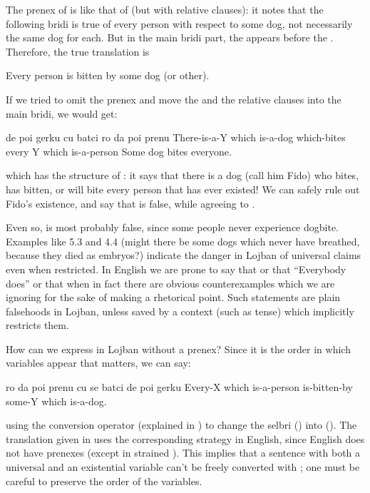 The prenex of  is like that
    of  (but with relative clauses):
    it notes that the following bridi is true of every person with
    respect to some dog, not necessarily the same dog for each. But
    in the main bridi part, the  appears before the .
    Therefore, the true translation is
\begin{example}
Every person is bitten by some dog (or other).
\end{example}

If we tried to omit the prenex and move the  and the
    relative clauses into the main bridi, we would get:
\begin{example}
de poi gerku cu batci\n
\T	ro da poi prenu\n
There-is-a-Y which is-a-dog which-bites\n
\T	every Y which is-a-person\n
Some dog bites everyone.
\end{example}

{\noindent}which has the structure of : it
    says that there is a dog (call him Fido) who bites, has bitten,
    or will bite every person that has ever existed! We can safely
    rule out Fido's existence, and say that  is false, while agreeing to . 

Even so,  is most probably
    false, since some people never experience dogbite. Examples
    like 5.3 and 4.4 (might there be some dogs which never have
    breathed, because they died as embryos?) indicate the danger in
    Lojban of universal claims even when restricted. In English we
    are prone to say that  or that ``Everybody
    does'' or that  when in fact there are obvious
    counterexamples which we are ignoring for the sake of making a
    rhetorical point. Such statements are plain falsehoods in
    Lojban, unless saved by a context (such as tense) which
    implicitly restricts them.

How can we express  in Lojban
    without a prenex? Since it is the order in which variables
    appear that matters, we can say:
\begin{example}
ro da poi prenu cu se batci\n
\T	de poi gerku\n
Every-X which is-a-person is-bitten-by some-Y\n
\T	which is-a-dog.
\end{example}

{\noindent}using the conversion operator  (explained in ) to change the selbri 
    () into  (). The
    translation given in  uses the
    corresponding strategy in English, since English does not have
    prenexes (except in strained ). This
    implies that a sentence with both a universal and an
    existential variable can't be freely converted with ; one
    must be careful to preserve the order of the variables. 

